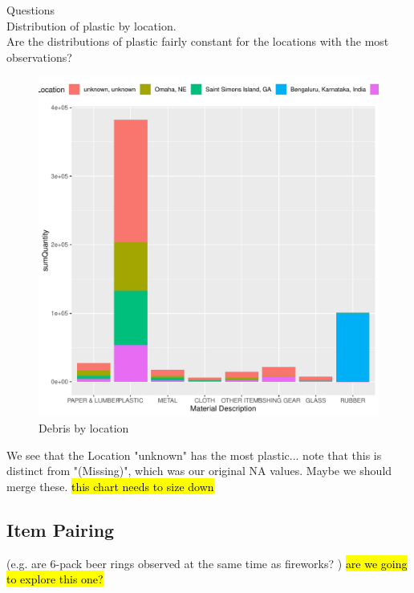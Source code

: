 \documentclass[10pt]{article}\usepackage[]{graphicx}\usepackage[]{color}
\makeatletter
\def\maxwidth{ %
  \ifdim\Gin@nat@width>\linewidth
    \linewidth
  \else
    \Gin@nat@width
  \fi
}
\newenvironment{knitrout}{}{} %
\makeatother
\begin{document}
Questions\\
Distribution of plastic by location.\\
Are the distributions of plastic fairly constant for the locations with the most observations?\\
\begin{figure}[H] %
\begin{center}
\begin{knitrout}
\color{fgcolor}
\includegraphics[width=\maxwidth]{figure/unnamed-chunk-17-1} 

\end{knitrout}
\caption {Debris by location}
\label{figG}
\end {center}
\end {figure}
We see that the Location "unknown" has the most plastic... note that this is distinct from "(Missing)", which was our original NA values. Maybe we should merge these.
\hl{this chart needs to size down}



\subsection{Item Pairing} 
(e.g. are 6-pack beer rings observed at the same time as fireworks? )
\hl{are we going to explore this one?}
\end{document}
